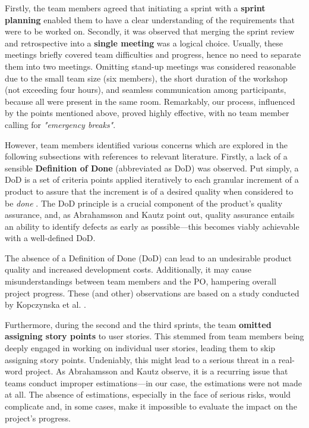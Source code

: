 \documentclass[conference]{IEEEtran}
\begin{document}
Firstly, the team members agreed that initiating a sprint with a \textbf{sprint
planning} enabled them to have a clear understanding of the requirements that
were to be worked on. Secondly, it was observed that merging the sprint review
and retrospective into a \textbf{single meeting} was a logical choice. Usually,
these meetings briefly covered team difficulties and progress, hence no need to
separate them into two meetings. Omitting stand-up meetings was considered
reasonable due to the small team size (six members), the short duration of the
workshop (not exceeding four hours), and seamless communication among
participants, because all were present in the same room. Remarkably, our
process, influenced by the points mentioned above, proved highly effective,
with no team member calling for \textit{"emergency breaks"}.

However, team members identified various concerns which are explored in the
following subsections with references to relevant literature. Firstly, a lack
of a sensible \textbf{Definition of Done} (abbreviated as DoD) was observed.
Put simply, a DoD is a set of criteria points applied iteratively to each
granular increment of a product to assure that the increment is of a desired
quality when considered to be \textit{done} \cite{Kopczynska2022}. The DoD
principle is a crucial component of the product's quality assurance, and, as
Abrahamsson and Kautz \cite{Abrahamsson2002} point out, quality assurance
entails an ability to identify defects as early as possible---this becomes
viably achievable with a well-defined DoD.

The absence of a Definition of Done (DoD) can lead to an undesirable product
quality and increased development costs. Additionally, it may cause
misunderstandings between team members and the PO, hampering overall project
progress. These (and other) observations are based on a study conducted by
Kopczynska et al. \cite{Kopczynska2022}.

Furthermore, during the second and the third sprints, the team \textbf{omitted
assigning story points} to user stories. This stemmed from team members being
deeply engaged in working on individual user stories, leading them to skip
assigning story points. Undeniably, this might lead to a serious threat in a
real-word project. As Abrahamsson and Kautz \cite{Abrahamsson2002} observe, it
is a recurring issue that teams conduct improper estimations---in our case, the
estimations were not made at all. The absence of estimations, especially in the
face of serious risks, would complicate and, in some cases, make it impossible
to evaluate the impact on the project's progress.
\end{document}
